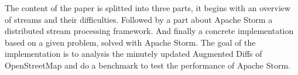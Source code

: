 The content of the paper is splitted into three parts, it begins with an overview of streams and their difficulties.
Followed by a part about Apache Storm a distributed stream processing framework.
And finally a concrete implementation based on a given problem, solved with Apache Storm.
The goal of the implementation is to analysis the minutely updated Augmented Diffs of OpenStreetMap
and do a benchmark to test the performance of Apache Storm.